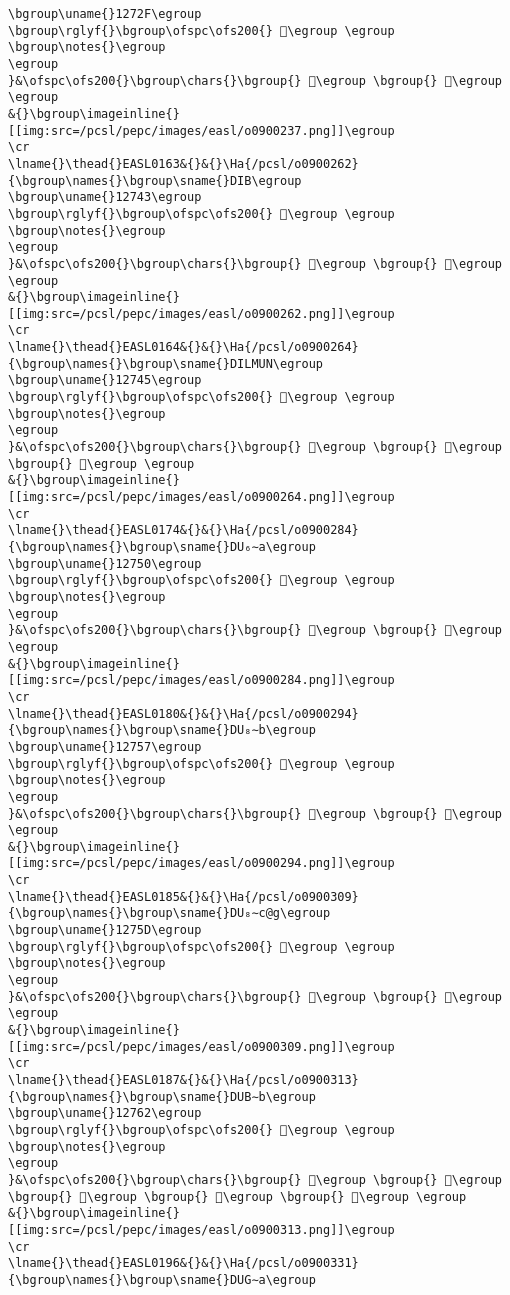 \begin{verbatim}
\bgroup\uname{}1272F\egroup
\bgroup\rglyf{}\bgroup\ofspc\ofs200{} 𒜯\egroup \egroup
\bgroup\notes{}\egroup
\egroup
}&\ofspc\ofs200{}\bgroup\chars{}\bgroup{} 𒜯\egroup \bgroup{} 𒜲\egroup \egroup
&{}\bgroup\imageinline{}[[img:src=/pcsl/pepc/images/easl/o0900237.png]]\egroup
\cr
\lname{}\thead{}EASL0163&{}&{}\Ha{/pcsl/o0900262}{\bgroup\names{}\bgroup\sname{}DIB\egroup
\bgroup\uname{}12743\egroup
\bgroup\rglyf{}\bgroup\ofspc\ofs200{} 𒝃\egroup \egroup
\bgroup\notes{}\egroup
\egroup
}&\ofspc\ofs200{}\bgroup\chars{}\bgroup{} 𒝃\egroup \bgroup{} 𒝄\egroup \egroup
&{}\bgroup\imageinline{}[[img:src=/pcsl/pepc/images/easl/o0900262.png]]\egroup
\cr
\lname{}\thead{}EASL0164&{}&{}\Ha{/pcsl/o0900264}{\bgroup\names{}\bgroup\sname{}DILMUN\egroup
\bgroup\uname{}12745\egroup
\bgroup\rglyf{}\bgroup\ofspc\ofs200{} 𒝅\egroup \egroup
\bgroup\notes{}\egroup
\egroup
}&\ofspc\ofs200{}\bgroup\chars{}\bgroup{} 𒝇\egroup \bgroup{} 𒝅\egroup \bgroup{} 𒝆\egroup \egroup
&{}\bgroup\imageinline{}[[img:src=/pcsl/pepc/images/easl/o0900264.png]]\egroup
\cr
\lname{}\thead{}EASL0174&{}&{}\Ha{/pcsl/o0900284}{\bgroup\names{}\bgroup\sname{}DU₆∼a\egroup
\bgroup\uname{}12750\egroup
\bgroup\rglyf{}\bgroup\ofspc\ofs200{} 𒝐\egroup \egroup
\bgroup\notes{}\egroup
\egroup
}&\ofspc\ofs200{}\bgroup\chars{}\bgroup{} 𒝑\egroup \bgroup{} 𒝐\egroup \egroup
&{}\bgroup\imageinline{}[[img:src=/pcsl/pepc/images/easl/o0900284.png]]\egroup
\cr
\lname{}\thead{}EASL0180&{}&{}\Ha{/pcsl/o0900294}{\bgroup\names{}\bgroup\sname{}DU₈∼b\egroup
\bgroup\uname{}12757\egroup
\bgroup\rglyf{}\bgroup\ofspc\ofs200{} 𒝗\egroup \egroup
\bgroup\notes{}\egroup
\egroup
}&\ofspc\ofs200{}\bgroup\chars{}\bgroup{} 𒝗\egroup \bgroup{} 𒝘\egroup \egroup
&{}\bgroup\imageinline{}[[img:src=/pcsl/pepc/images/easl/o0900294.png]]\egroup
\cr
\lname{}\thead{}EASL0185&{}&{}\Ha{/pcsl/o0900309}{\bgroup\names{}\bgroup\sname{}DU₈∼c@g\egroup
\bgroup\uname{}1275D\egroup
\bgroup\rglyf{}\bgroup\ofspc\ofs200{} 𒝝\egroup \egroup
\bgroup\notes{}\egroup
\egroup
}&\ofspc\ofs200{}\bgroup\chars{}\bgroup{} 𒝝\egroup \bgroup{} 𒝞\egroup \egroup
&{}\bgroup\imageinline{}[[img:src=/pcsl/pepc/images/easl/o0900309.png]]\egroup
\cr
\lname{}\thead{}EASL0187&{}&{}\Ha{/pcsl/o0900313}{\bgroup\names{}\bgroup\sname{}DUB∼b\egroup
\bgroup\uname{}12762\egroup
\bgroup\rglyf{}\bgroup\ofspc\ofs200{} 𒝢\egroup \egroup
\bgroup\notes{}\egroup
\egroup
}&\ofspc\ofs200{}\bgroup\chars{}\bgroup{} 𒝡\egroup \bgroup{} 𒝠\egroup \bgroup{} 𒝣\egroup \bgroup{} 𒝢\egroup \bgroup{} 𒝤\egroup \egroup
&{}\bgroup\imageinline{}[[img:src=/pcsl/pepc/images/easl/o0900313.png]]\egroup
\cr
\lname{}\thead{}EASL0196&{}&{}\Ha{/pcsl/o0900331}{\bgroup\names{}\bgroup\sname{}DUG∼a\egroup

\end{verbatim}
